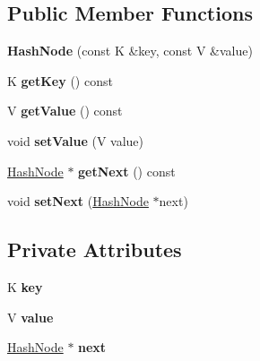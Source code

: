 \subsection*{Public Member Functions}
\begin{DoxyCompactItemize}
\item 
\mbox{\label{class_hash_node_a274d93360f64e94f76c260d604ce1fc0}} 
{\bfseries Hash\+Node} (const K \&key, const V \&value)
\item 
\mbox{\label{class_hash_node_afeb6b1e9b71eef17edfe6f9ebc9f47ba}} 
K {\bfseries get\+Key} () const
\item 
\mbox{\label{class_hash_node_a6d5ab91b69df97ad44caf19b518f8449}} 
V {\bfseries get\+Value} () const
\item 
\mbox{\label{class_hash_node_a6b52b6a71153980c851a35ad7dc0dbee}} 
void {\bfseries set\+Value} (V value)
\item 
\mbox{\label{class_hash_node_a644b981b90d041fd96cf19acf4b7a7cf}} 
\hyperlink{class_hash_node}{Hash\+Node} $\ast$ {\bfseries get\+Next} () const
\item 
\mbox{\label{class_hash_node_a1699b692e3cdf1a0807f227c4651beab}} 
void {\bfseries set\+Next} (\hyperlink{class_hash_node}{Hash\+Node} $\ast$next)
\end{DoxyCompactItemize}
\subsection*{Private Attributes}
\begin{DoxyCompactItemize}
\item 
\mbox{\label{class_hash_node_af8ed0b83df2918f43486920bfe8018f3}} 
K {\bfseries key}
\item 
\mbox{\label{class_hash_node_a2e18d287f4d32b3ae3146829f575adb5}} 
V {\bfseries value}
\item 
\mbox{\label{class_hash_node_a745c21aaedb453ad6b334282d1186a05}} 
\hyperlink{class_hash_node}{Hash\+Node} $\ast$ {\bfseries next}
\end{DoxyCompactItemize}


